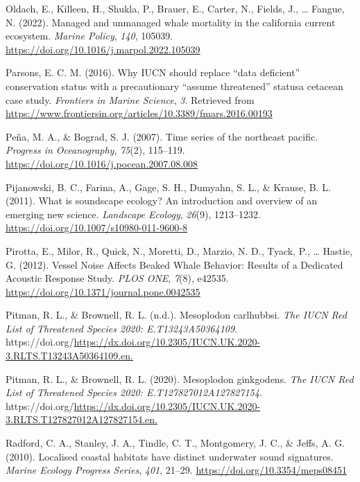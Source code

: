 \documentclass[
]{article}
\newlength{\cslhangindent}
\newlength{\cslentryspacingunit} %
\newenvironment{CSLReferences}[2] %
 {%
  \setlength{\parindent}{0pt}
  \ifodd #1
  \let\oldpar\par
  \def\par{\hangindent=\cslhangindent\oldpar}
  \fi
  \setlength{\parskip}{#2\cslentryspacingunit}
 }%
 {}
\begin{document}
\begin{CSLReferences}{1}{0}
\leavevmode{}%
Oldach, E., Killeen, H., Shukla, P., Brauer, E., Carter, N., Fields, J.,
\ldots{} Fangue, N. (2022). Managed and unmanaged whale mortality in the
california current ecosystem. \emph{Marine Policy}, \emph{140}, 105039.
\url{https://doi.org/10.1016/j.marpol.2022.105039}

\leavevmode{}%
Parsons, E. C. M. (2016). Why IUCN should replace {``}data deficient{''}
conservation status with a precautionary {``}assume threatened{''}
status{\textemdash}a cetacean case study. \emph{Frontiers in Marine
Science}, \emph{3}. Retrieved from
\url{https://www.frontiersin.org/articles/10.3389/fmars.2016.00193}

\leavevmode{}%
Peña, M. A., \& Bograd, S. J. (2007). Time series of the northeast
pacific. \emph{Progress in Oceanography}, \emph{75}(2), 115--119.
\url{https://doi.org/10.1016/j.pocean.2007.08.008}

\leavevmode{}%
Pijanowski, B. C., Farina, A., Gage, S. H., Dumyahn, S. L., \& Krause,
B. L. (2011). What is soundscape ecology? An introduction and overview
of an emerging new science. \emph{Landscape Ecology}, \emph{26}(9),
1213--1232. \url{https://doi.org/10.1007/s10980-011-9600-8}

\leavevmode{}%
Pirotta, E., Milor, R., Quick, N., Moretti, D., Marzio, N. D., Tyack,
P., \ldots{} Hastie, G. (2012). Vessel Noise Affects Beaked Whale
Behavior: Results of a Dedicated Acoustic Response Study. \emph{PLOS
ONE}, \emph{7}(8), e42535.
\url{https://doi.org/10.1371/journal.pone.0042535}

\leavevmode{}%
Pitman, R. L., \& Brownell, R. L. (n.d.). Mesoplodon carlhubbsi.
\emph{The IUCN Red List of Threatened Species 2020: E.T13243A50364109}.
https://doi.org/\url{https://dx.doi.org/10.2305/IUCN.UK.2020-3.RLTS.T13243A50364109.en.}

\leavevmode{}%
Pitman, R. L., \& Brownell, R. L. (2020). Mesoplodon ginkgodens.
\emph{The IUCN Red List of Threatened Species 2020:
E.T127827012A127827154}.
https://doi.org/\url{https://dx.doi.org/10.2305/IUCN.UK.2020-3.RLTS.T127827012A127827154.en.}

\leavevmode{}%
Radford, C. A., Stanley, J. A., Tindle, C. T., Montgomery, J. C., \&
Jeffs, A. G. (2010). Localised coastal habitats have distinct underwater
sound signatures. \emph{Marine Ecology Progress Series}, \emph{401},
21--29. \url{https://doi.org/10.3354/meps08451}


\end{CSLReferences}
\end{document}
